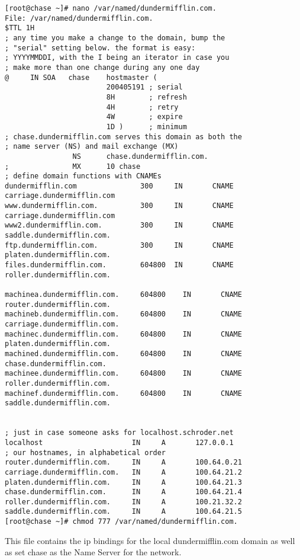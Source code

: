 \documentclass[11pt,onside]{article}
\begin{document}
\begin{lstlisting}
[root@chase ~]# nano /var/named/dundermifflin.com.
File: /var/named/dundermifflin.com.
$TTL 1H
; any time you make a change to the domain, bump the
; "serial" setting below. the format is easy:
; YYYYMMDDI, with the I being an iterator in case you
; make more than one change during any one day
@     IN SOA   chase    hostmaster (
                        200405191 ; serial
                        8H        ; refresh
                        4H        ; retry
                        4W        ; expire
                        1D )      ; minimum
; chase.dundermifflin.com serves this domain as both the
; name server (NS) and mail exchange (MX)
                NS      chase.dundermifflin.com.
;               MX      10 chase
; define domain functions with CNAMEs
dundermifflin.com               300     IN       CNAME   carriage.dundermifflin.com
www.dundermifflin.com.          300     IN       CNAME   carriage.dundermifflin.com
www2.dundermifflin.com.         300     IN       CNAME   saddle.dundermifflin.com.
ftp.dundermifflin.com.          300     IN       CNAME   platen.dundermifflin.com.
files.dundermifflin.com.        604800  IN       CNAME   roller.dundermifflin.com.

machinea.dundermifflin.com.     604800    IN       CNAME   router.dundermifflin.com.
machineb.dundermifflin.com.     604800    IN       CNAME   carriage.dundermifflin.com.
machinec.dundermifflin.com.     604800    IN       CNAME   platen.dundermifflin.com.
machined.dundermifflin.com.     604800    IN       CNAME   chase.dundermifflin.com.
machinee.dundermifflin.com.     604800    IN       CNAME   roller.dundermifflin.com.
machinef.dundermifflin.com.     604800    IN       CNAME   saddle.dundermifflin.com.


; just in case someone asks for localhost.schroder.net
localhost                     IN     A       127.0.0.1
; our hostnames, in alphabetical order
router.dundermifflin.com.     IN     A       100.64.0.21
carriage.dundermifflin.com.   IN     A       100.64.21.2
platen.dundermifflin.com.     IN     A       100.64.21.3
chase.dundermifflin.com.      IN     A       100.64.21.4
roller.dundermifflin.com.     IN     A       100.21.32.2
saddle.dundermifflin.com.     IN     A       100.64.21.5
[root@chase ~]# chmod 777 /var/named/dundermifflin.com.
\end{lstlisting}
This file contains the ip bindings for the local dundermifflin.com domain as well as set chase as the Name Server for the network. \\
\end{document}

